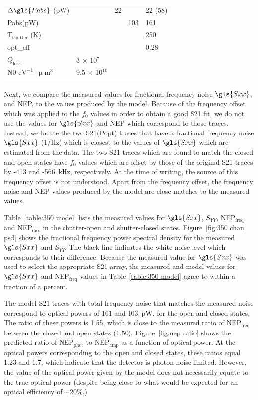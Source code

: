 \begin{table}[!htbp]
\begin{threeparttable}
\begin{tabular}{@{}lllll@{}}
$\Delta \gls{Pabs}$ (pW) &  & 22 &  & 22 (58) \\
\gls{Pabs}(pW) &  &  & 103 & 161 \\
T$_{\mathrm{shutter}}$ (K) &  &  &  & 250 \\
\gls{opt_eff} &  &  &  & 0.28 \\
$Q_{\mathrm{loss}}$  & 3 $\times$ 10$^{7}$ & & & \\
\gls{N0} $\mathrm{eV}^{-1}$~$\upmu$m$^{3}$ & 9.5 $\times$ 10$^{10}$ &  &  &  \\ \dbottomrule{}
\\
\end{tabular}
\end{threeparttable}
\end{table}

Next, we compare the measured values for fractional frequency noise $\gls{Sxx}$, and NEP, to the values produced by the model. Because of the frequency offset which was applied to the $f_{0}$ values in order to obtain a good \gls{S21} fit, we do not use the values for $\gls{Sxx}$ and NEP which correspond to those traces. Instead, we locate the two \gls{S21}(\gls{Popt}) traces that have a fractional frequency noise $\gls{Sxx}$ (1/Hz) which is closest to the values of $\gls{Sxx}$ which are estimated from the data. The two \gls{S21} traces which are found to match the closed and open states have $f_{0}$ values which are offset by those of the original \gls{S21} traces by -413 and -566~kHz, respectively. At the time of writing, the source of this frequency offset is not understood. Apart from the frequency offset, the frequency noise and NEP values produced by the model are close matches to the measured values.

Table~\ref{table:350 model} lists the measured values for $\gls{Sxx}$, $S_{YY}$, NEP$_{\mathrm{freq}}$ and NEP$_{\mathrm{diss}}$ in the shutter-open and shutter-closed states. Figure~\ref{fig:350 chan psd} shows the fractional frequency power spectral density for the measured $\gls{Sxx}$ and $S_{YY}$. The black line indicates the white noise level which corresponds to their difference. Because the measured value for $\gls{Sxx}$ was used to select the appropriate \gls{S21} array, the measured and model values for $\gls{Sxx}$ and NEP$_{\mathrm{freq}}$ values in Table~\ref{table:350 model} agree to within a fraction of a percent.

The model \gls{S21} traces with total frequency noise that matches the measured noise correspond to optical powers of 161 and 103~pW, for the open and closed states. The ratio of these powers is 1.55, which is close to the measured ratio of NEP$_{\mathrm{freq}}$ between the closed and open states (1.50). Figure~\ref{fig:nep ratio} shows the predicted ratio of NEP$_{\mathrm{phot}}$ to NEP$_{\mathrm{amp}}$ as a function of optical power. At the optical powers corresponding to the open and closed states, these ratios equal 1.23 and 1.7, which indicate that the detector is photon noise limited. However, the value of the optical power given by the model does not necessarily equate to the true optical power (despite being close to what would be expected for an optical efficiency of $\sim$20\%.)

